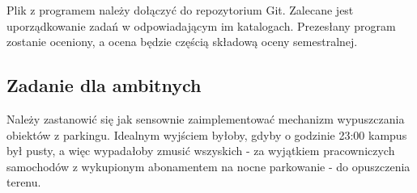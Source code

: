 \documentclass{article}
\begin{document}
	Plik z programem należy dołączyć do repozytorium Git. Zalecane jest uporządkowanie zadań w odpowiadającym im katalogach. Prezesłany program zostanie oceniony, a ocena będzie częścią składową oceny semestralnej.
	
	\subsection{Zadanie dla ambitnych}
	Należy zastanowić się jak sensownie zaimplementować mechanizm wypuszczania obiektów z parkingu. Idealnym wyjściem byłoby, gdyby o godzinie 23:00 kampus był pusty, a więc wypadałoby zmusić wszyskich - za wyjątkiem pracowniczych samochodów z wykupionym abonamentem na nocne parkowanie - do opuszczenia terenu. 
\end{document}
